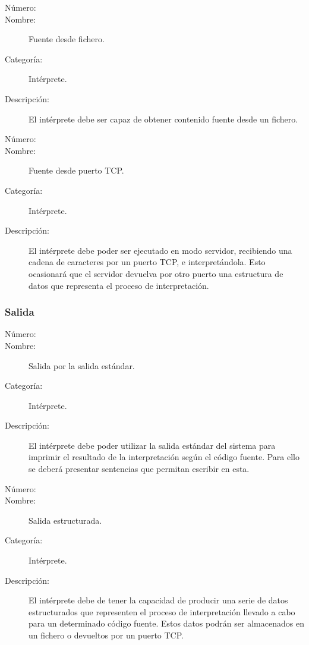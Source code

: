 \begin{framed}
	\begin{description}
		\item [Número:] \cn
		\item [Nombre:] Fuente desde fichero.
		\item [Categoría:] Intérprete.
		\item [Descripción:] El intérprete debe ser capaz de obtener contenido fuente desde un fichero.
	\end {description}
\end{framed}

\begin{framed}
	\begin{description}
		\item [Número:] \cn
		\item [Nombre:] Fuente desde puerto TCP.
		\item [Categoría:] Intérprete.
		\item [Descripción:] El intérprete debe poder ser ejecutado en modo servidor, recibiendo una cadena de caracteres por un puerto TCP, e interpretándola. Esto ocasionará que el 
servidor devuelva por otro puerto una estructura de datos que representa el proceso de interpretación. 
	\end {description}
\end{framed}

\subsubsection{Salida}

\begin{framed}
	\begin{description}
		\item [Número:] \cn
		\item [Nombre:] Salida por la salida estándar.
		\item [Categoría:] Intérprete.
		\item [Descripción:] El intérprete debe poder utilizar la salida estándar del sistema
para imprimir el resultado de la interpretación según el código fuente. Para ello se deberá presentar
sentencias que permitan escribir en esta.
	\end {description}
\end{framed}

\begin{framed}
	\begin{description}
		\item [Número:] \cn
		\item [Nombre:] Salida estructurada.
		\item [Categoría:] Intérprete.
		\item [Descripción:] El intérprete debe de tener la capacidad de producir una serie 
de datos estructurados que representen el proceso de interpretación llevado a cabo para un determinado código fuente. Estos datos podrán ser almacenados en un fichero o devueltos por 
un puerto TCP.
	\end {description}
\end{framed}

